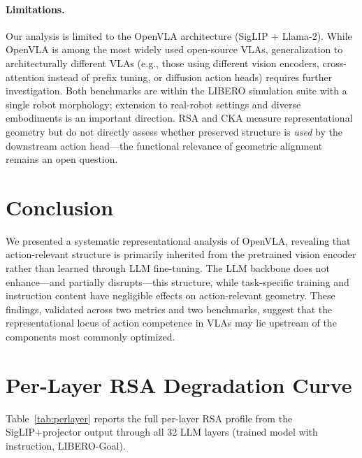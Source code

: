 \documentclass[letterpaper]{article}
\begin{document}
\paragraph{Limitations.}
Our analysis is limited to the OpenVLA architecture (SigLIP + Llama-2).
While OpenVLA is among the most widely used open-source VLAs, generalization to architecturally different VLAs (e.g., those using different vision encoders, cross-attention instead of prefix tuning, or diffusion action heads) requires further investigation.
Both benchmarks are within the LIBERO simulation suite with a single robot morphology; extension to real-robot settings and diverse embodiments is an important direction.
RSA and CKA measure representational geometry but do not directly assess whether preserved structure is \emph{used} by the downstream action head---the functional relevance of geometric alignment remains an open question.

\section{Conclusion}
\label{sec:conclusion}

We presented a systematic representational analysis of OpenVLA, revealing that action-relevant structure is primarily inherited from the pretrained vision encoder rather than learned through LLM fine-tuning.
The LLM backbone does not enhance---and partially disrupts---this structure, while task-specific training and instruction content have negligible effects on action-relevant geometry.
These findings, validated across two metrics and two benchmarks, suggest that the representational locus of action competence in VLAs may lie upstream of the components most commonly optimized.

\appendix
\section{Per-Layer RSA Degradation Curve}
\label{app:perlayer}

Table~\ref{tab:perlayer} reports the full per-layer RSA profile from the SigLIP+projector output through all 32 LLM layers (trained model with instruction, LIBERO-Goal).
\end{document}
